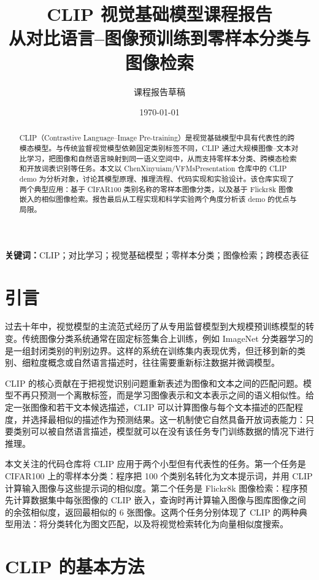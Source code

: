 \documentclass[UTF8,zihao=-4]{ctexart}
\title{\textbf{CLIP 视觉基础模型课程报告}\\
\large 从对比语言--图像预训练到零样本分类与图像检索}
\author{课程报告草稿}
\date{\today}
\begin{document}
\maketitle

\begin{abstract}
CLIP（Contrastive Language--Image Pre-training）是视觉基础模型中具有代表性的跨模态模型。与传统监督视觉模型依赖固定类别标签不同，CLIP 通过大规模图像--文本对比学习，把图像和自然语言映射到同一语义空间中，从而支持零样本分类、跨模态检索和开放词表识别等任务。本文以 ChenXinyuiam/VFMsPresentation 仓库中的 CLIP demo 为分析对象，讨论其模型原理、推理流程、代码实现和实验设计。该仓库实现了两个典型应用：基于 CIFAR100 类别名称的零样本图像分类，以及基于 Flickr8k 图像嵌入的相似图像检索。报告最后从工程实现和科学实验两个角度分析该 demo 的优点与局限。
\end{abstract}

\noindent\textbf{关键词：}CLIP；对比学习；视觉基础模型；零样本分类；图像检索；跨模态表征

\section{引言}

过去十年中，视觉模型的主流范式经历了从专用监督模型到大规模预训练模型的转变。传统图像分类系统通常在固定标签集合上训练，例如 ImageNet 分类器学习的是一组封闭类别的判别边界。这样的系统在训练集内表现优秀，但迁移到新的类别、细粒度概念或自然语言描述时，往往需要重新标注数据并微调模型。

CLIP 的核心贡献在于把视觉识别问题重新表述为图像和文本之间的匹配问题。模型不再只预测一个离散标签，而是学习图像表示和文本表示之间的语义相似性。给定一张图像和若干文本候选描述，CLIP 可以计算图像与每个文本描述的匹配程度，并选择最相似的描述作为预测结果。这一机制使它自然具备开放词表能力：只要类别可以被自然语言描述，模型就可以在没有该任务专门训练数据的情况下进行推理。

本文关注的代码仓库将 CLIP 应用于两个小型但有代表性的任务。第一个任务是 CIFAR100 上的零样本分类：程序把 100 个类别名转化为文本提示词，并用 CLIP 计算输入图像与这些提示词的相似度。第二个任务是 Flickr8k 图像检索：程序预先计算数据集中每张图像的 CLIP 嵌入，查询时再计算输入图像与图库图像之间的余弦相似度，返回最相似的 6 张图像。这两个任务分别体现了 CLIP 的两种典型用法：将分类转化为图文匹配，以及将视觉检索转化为向量相似度搜索。

\section{CLIP 的基本方法}
\end{document}
